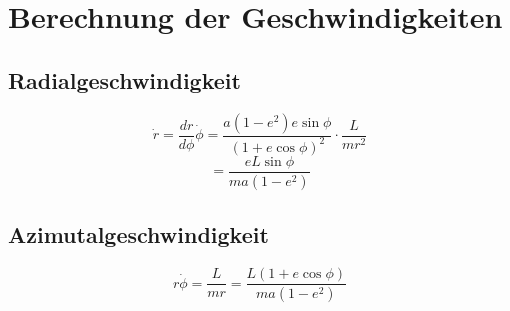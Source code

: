 \section{Berechnung der Geschwindigkeiten}
\subsection{Radialgeschwindigkeit}
\[
\dot{r} = \frac{dr}{d\phi} \dot{\phi} = \frac{a(1 - e^2) e \sin \phi}{(1 + e \cos \phi)^2} \cdot \frac{L}{m r^2}
\]
\[
= \frac{e L \sin \phi}{m a (1 - e^2)}
\]

\subsection{Azimutalgeschwindigkeit}
\[
r \dot{\phi} = \frac{L}{m r} = \frac{L (1 + e \cos \phi)}{m a (1 - e^2)}
\]